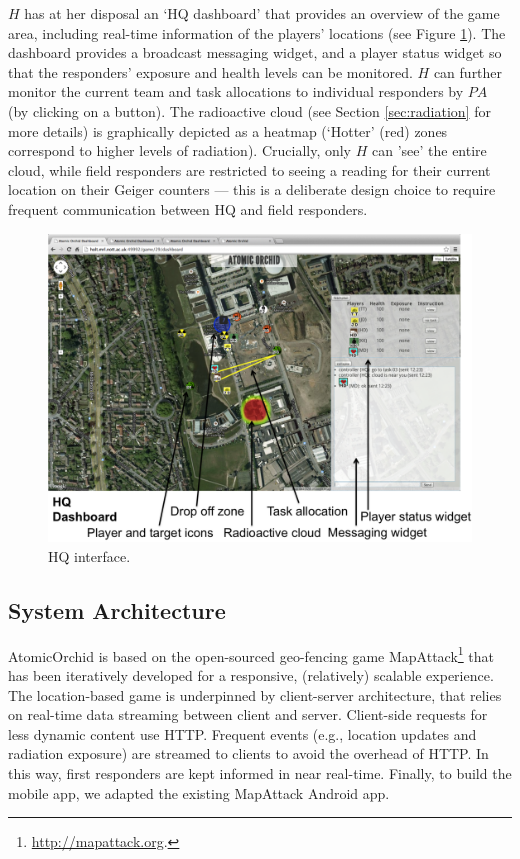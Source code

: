 $H$ has at her disposal an `HQ dashboard' that provides an over\-view of the game area, including real-time information of the players' locations (see Figure \ref{fig:ui2}). The dashboard provides a broadcast messaging widget, and a player status widget so that the responders' exposure and health levels can be monitored. $H$ can further monitor the  current team and task allocations to individual responders by $PA$ (by clicking on a button). The radioactive cloud (see Section \ref{sec:radiation} for more details) is graphically depicted as a heatmap (`Hotter'  (red) zones correspond to higher levels of radiation). Crucially, only  $H$ can 'see' the entire cloud, while field responders are restricted to seeing a reading for their current location on their Geiger counters --- this is a deliberate design choice to require frequent communication between HQ and field responders. 
\begin{figure}[htbp]
\includegraphics[width=\columnwidth]{dashboard.png}
\caption{HQ interface.}
\label{fig:ui2}
\end{figure}

\subsection{System Architecture}
\noindent AtomicOrchid is based on the open-sourced geo-fencing game MapAttack\footnote{\url{http://mapattack.org}.} that has been iteratively developed for a responsive, (relatively) scalable experience.  The location-based game is underpinned by client-server architecture, that relies on real-time data streaming between client and server. Client-side requests for less dynamic content use HTTP. Frequent events (e.g., location updates and radiation exposure) are streamed to clients to avoid the overhead of HTTP. In this way, first responders are kept informed in near real-time. Finally,  to build the mobile app, we adapted the existing MapAttack Android app.

